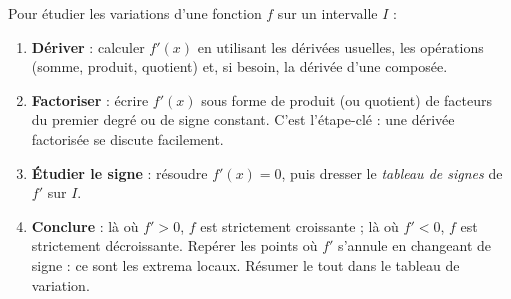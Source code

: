 \documentclass[11pt]{article}
\begin{document}
\begin{methode}
Pour étudier les variations d'une fonction $f$ sur un intervalle $I$ :
\begin{enumerate}
\item \textbf{Dériver} : calculer $f'(x)$ en utilisant les dérivées usuelles, les opérations (somme, produit, quotient) et, si besoin, la dérivée d'une composée.
\item \textbf{Factoriser} : écrire $f'(x)$ sous forme de produit (ou quotient) de facteurs du premier degré ou de signe constant. C'est l'étape-clé : une dérivée factorisée se discute facilement.
\item \textbf{Étudier le signe} : résoudre $f'(x) = 0$, puis dresser le \emph{tableau de signes} de $f'$ sur $I$.
\item \textbf{Conclure} : là où $f' > 0$, $f$ est strictement croissante ; là où $f' < 0$, $f$ est strictement décroissante. Repérer les points où $f'$ s'annule en changeant de signe : ce sont les extrema locaux. Résumer le tout dans le tableau de variation.
\end{enumerate}
\end{methode}
\end{document}
